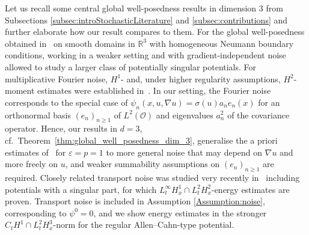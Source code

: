 \documentclass[reqno]{amsart}
\newcommand{\R}{\mathbb{R}}
\newcommand{\sO}{\mathscr{O}}
\newcommand{\1}{\mathbf{1}}
\newcommand{\grad}{\nabla}
\begin{document}
Let us recall some central global well-posedness results in dimension $3$ from Subsections \ref{subsec:introStochasticLiterature} and \ref{subsec:contributions} and further elaborate how our result compares to them.
For the global well-posedness obtained in~\cite{Scarpa2018} on smooth domains in $\R^3$ with homogeneous Neumann boundary conditions, working in a weaker setting and with gradient-independent noise allowed to study a larger class of potentially singular potentials. For multiplicative Fourier noise, $H^1$- and, under higher regularity assumptions, $H^2$-moment estimates were established in~\cite{Antonopoulou23}. In our setting, the Fourier noise corresponds to the special case of $\psi_n(x,u,\grad u)=\sigma(u)a_n e_n(x)$ for an orthonormal basis $(e_n)_{n\ge 1}$ of $L^2(\sO)$ and eigenvalues $a_n^2$ of the covariance operator. Hence, our results in $d=3$, cf.\ Theorem~\ref{thm:global_well_posedness_dim_3}, generalise the a priori estimates of~\cite[Thm.~2.2]{Antonopoulou23} for $\varepsilon=p=1$ to more general noise that may depend on $\grad u$ and more freely on $u$, and weaker summability assumptions on $(e_n)_{n\geq 1}$ are required. Closely related transport noise was studied very recently in~\cite{diPrimioPapiniScarpa26} including potentials with a singular part, for which $L_t^\infty H_x^1 \cap L_t^2H_x^2$-energy estimates are proven. Transport noise is included in Assumption \ref{Assumption:noise}, corresponding to $\psi^0=0$, and we show energy estimates in the stronger $C_tH^1\cap L_t^2H_x^3$-norm for the regular Allen--Cahn-type potential.\\
\end{document}
